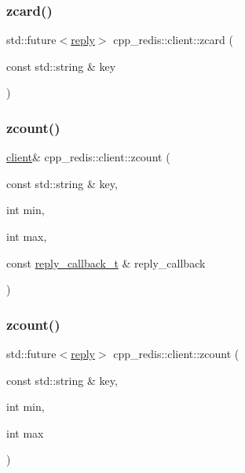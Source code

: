 \mbox{\label{classcpp__redis_1_1client_a9cfeae7394f3fa2b3ff7ec1f1c56ca1b}} 
\subsubsection{\texorpdfstring{zcard()}{zcard()}\hspace{0.1cm}{\footnotesize\ttfamily [2/2]}}
{\footnotesize\ttfamily std\+::future$<$\hyperlink{classcpp__redis_1_1reply}{reply}$>$ cpp\+\_\+redis\+::client\+::zcard (\begin{DoxyParamCaption}\item[{const std\+::string \&}]{key }\end{DoxyParamCaption})}

\mbox{\label{classcpp__redis_1_1client_a405463c110eb39e66163f0d936e42815}} 
\subsubsection{\texorpdfstring{zcount()}{zcount()}\hspace{0.1cm}{\footnotesize\ttfamily [1/6]}}
{\footnotesize\ttfamily \hyperlink{classcpp__redis_1_1client}{client}\& cpp\+\_\+redis\+::client\+::zcount (\begin{DoxyParamCaption}\item[{const std\+::string \&}]{key,  }\item[{int}]{min,  }\item[{int}]{max,  }\item[{const \hyperlink{classcpp__redis_1_1client_a061a1140d36d2eaeda82b09a0bb3f9f2}{reply\+\_\+callback\+\_\+t} \&}]{reply\+\_\+callback }\end{DoxyParamCaption})}

\mbox{\label{classcpp__redis_1_1client_a7965bc6ab1198ca3bb5b31c10da95c34}} 
\subsubsection{\texorpdfstring{zcount()}{zcount()}\hspace{0.1cm}{\footnotesize\ttfamily [2/6]}}
{\footnotesize\ttfamily std\+::future$<$\hyperlink{classcpp__redis_1_1reply}{reply}$>$ cpp\+\_\+redis\+::client\+::zcount (\begin{DoxyParamCaption}\item[{const std\+::string \&}]{key,  }\item[{int}]{min,  }\item[{int}]{max }\end{DoxyParamCaption})}

